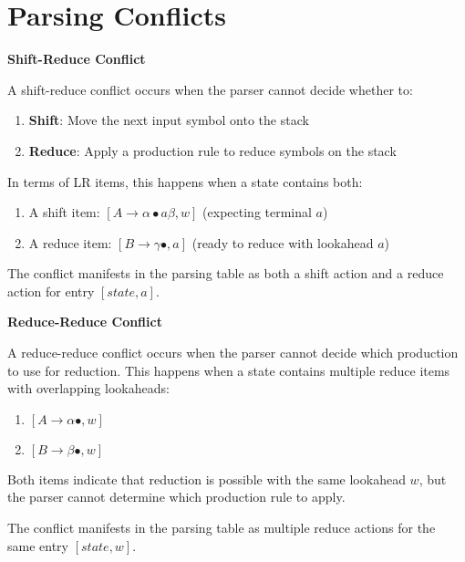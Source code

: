 \section{Parsing Conflicts}

\textbf{Shift-Reduce Conflict}

A shift-reduce conflict occurs when the parser cannot decide whether to:
\begin{enumerate}
\item \textbf{Shift}: Move the next input symbol onto the stack
\item \textbf{Reduce}: Apply a production rule to reduce symbols on the stack
\end{enumerate}

In terms of LR items, this happens when a state contains both:
\begin{enumerate}
\item A shift item: $[A \to \alpha \bullet a \beta, w]$ (expecting terminal $a$)
\item A reduce item: $[B \to \gamma \bullet, a]$ (ready to reduce with lookahead $a$)
\end{enumerate}

The conflict manifests in the parsing table as both a shift action and a reduce action for entry $[state, a]$.


\textbf{Reduce-Reduce Conflict}

A reduce-reduce conflict occurs when the parser cannot decide which production to use for reduction. This happens when a state contains multiple reduce items with overlapping lookaheads:
\begin{enumerate}
\item $[A \to \alpha \bullet, w]$
\item $[B \to \beta \bullet, w]$
\end{enumerate}

Both items indicate that reduction is possible with the same lookahead $w$, but the parser cannot determine which production rule to apply.

The conflict manifests in the parsing table as multiple reduce actions for the same entry $[state, w]$.
